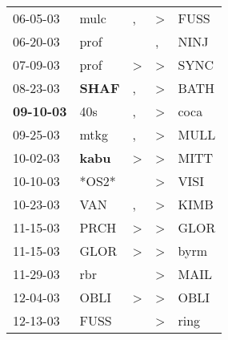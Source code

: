 \begin{supertabular}{p{0.07\textwidth}p{0.06\textwidth}p{0.02\textwidth}p{0.02\textwidth}p{0.06\textwidth}}
          06-05-03\textsuperscript{} &           mulc\textsuperscript{} &                , &     \textgreater &           FUSS\textsuperscript{} \\
          06-20-03\textsuperscript{} &           prof\textsuperscript{} &                  &                , &           NINJ\textsuperscript{} \\
          07-09-03\textsuperscript{} &           prof\textsuperscript{} &     \textgreater &     \textgreater &           SYNC\textsuperscript{} \\
          08-23-03\textsuperscript{} &  \textbf{SHAF\textsuperscript{}} &                , &     \textgreater &           BATH\textsuperscript{} \\
 \textbf{09-10-03\textsuperscript{}} &            40s\textsuperscript{} &                , &     \textgreater &           coca\textsuperscript{} \\
          09-25-03\textsuperscript{} &           mtkg\textsuperscript{} &                , &     \textgreater &           MULL\textsuperscript{} \\
          10-02-03\textsuperscript{} &  \textbf{kabu\textsuperscript{}} &     \textgreater &     \textgreater &           MITT\textsuperscript{} \\
          10-10-03\textsuperscript{} &                            *OS2* &                  &     \textgreater &           VISI\textsuperscript{} \\
          10-23-03\textsuperscript{} &            VAN\textsuperscript{} &                , &     \textgreater &           KIMB\textsuperscript{} \\
          11-15-03\textsuperscript{} &           PRCH\textsuperscript{} &     \textgreater &     \textgreater &           GLOR\textsuperscript{} \\
          11-15-03\textsuperscript{} &           GLOR\textsuperscript{} &     \textgreater &     \textgreater &           byrm\textsuperscript{} \\
          11-29-03\textsuperscript{} &            rbr\textsuperscript{} &                  &     \textgreater &           MAIL\textsuperscript{} \\
          12-04-03\textsuperscript{} &           OBLI\textsuperscript{} &     \textgreater &     \textgreater &           OBLI\textsuperscript{} \\
          12-13-03\textsuperscript{} &           FUSS\textsuperscript{} &                  &     \textgreater &           ring\textsuperscript{} \\

\end{supertabular}
